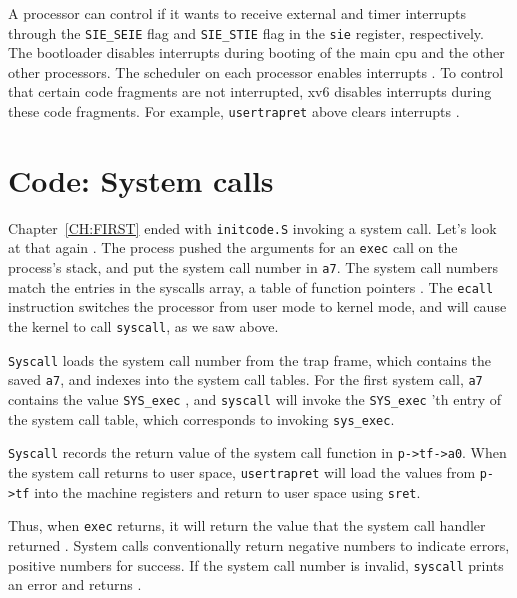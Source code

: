 A processor can control if it wants to receive external and timer
interrupts through the \lstinline{SIE_SEIE}
 flag and \lstinline{SIE_STIE}
 flag in the \texttt{sie}
register, respectively.  The bootloader disables interrupts during
booting of the main cpu and the other other processors.  The scheduler on
each processor enables interrupts .  To
control that certain code fragments are not interrupted, xv6 disables
interrupts during these code fragments.  For example,
\lstinline{usertrapret} above clears interrupts
.

\section{Code: System calls}

Chapter~\ref{CH:FIRST} ended with 
\lstinline{initcode.S}
invoking a system call.
Let's look at that again
.
The process pushed the arguments
for an 
\lstinline{exec}
call on the process's stack, and put the
system call number in
\texttt{a7}.
The system call numbers match the entries in the syscalls array,
a table of function pointers
.
The \lstinline{ecall} instruction
switches the processor from user mode to kernel mode, and will
cause the kernel to call \lstinline{syscall}, as we saw above.

\lstinline{Syscall}
loads the system call number from the trap frame, which
contains the saved
\texttt{a7},
and indexes into the system call tables.
For the first system call, 
\texttt{a7}
contains the value 
\lstinline{SYS_exec}
,
and
\lstinline{syscall}
will invoke the 
\lstinline{SYS_exec} 'th 
entry of the system call table, which corresponds to invoking
\lstinline{sys_exec}.

\lstinline{Syscall}
records the return value of the system call function in
\lstinline{p->tf->a0}.
When the system call returns to user space,
\lstinline{usertrapret}
will load the values
from
\lstinline{p->tf}
into the machine registers
and return to user space
using
\lstinline{sret}.

Thus, when 
\lstinline{exec}
returns, it will return the value
that the system call handler returned
.
System calls conventionally return negative numbers to indicate
errors, positive numbers for success.
If the system call number is invalid,
\lstinline{syscall}
prints an error and returns .

